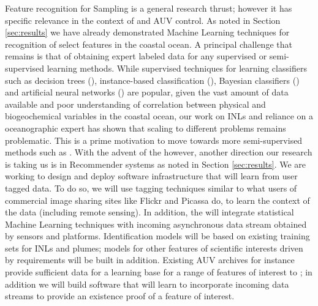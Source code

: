 Feature recognition for Sampling is a general research thrust; however
it has specific relevance in the context of \rx and AUV control. As
noted in Section \ref{sec:results} we have already demonstrated
Machine Learning techniques for recognition of select features in the
coastal ocean. A principal challenge that remains is that of obtaining
expert labeled data for any supervised or semi-supervised learning
methods.  While supervised techniques for learning classifiers such as
decision trees (\cite{Quinlan93-dtrees}), instance-based
classification (\cite{Aha-ibl-ml91}), Bayesian classifiers
(\cite{Jensen2001-BNetworks}) and artificial neural networks
(\cite{ANNsurvey-2000}) are popular, given the vast amount of data
available and poor understanding of correlation between physical and
biogeochemical variables in the coastal ocean, our work on INLs
\cite{mcgann08d,ryan10} and reliance on a oceanographic expert has
shown that scaling to different problems remains problematic. This is
a prime motivation to move towards more semi-supervised methods such
as \cite{kumar11,sergio12}. With the advent of the \od however,
another direction our research is taking us is in Recommender systems
\cite{Adomavicius05} as noted in Section \ref{sec:results}. We are
working to design and deploy software infrastructure that will learn
from user tagged data. To do so, we will use tagging techniques
similar to what users of commercial image sharing sites like Flickr
and Picassa do, to learn the context of the data (including remote
sensing). In addition, the \od will integrate statistical Machine
Learning techniques with incoming asynchronous data stream obtained by
sensors and platforms. Identification models will be based on existing
training sets for INLs and plumes; models for other features of
scientific interests driven by \can requirements will be built in
addition. Existing AUV archives for instance provide sufficient data
for a learning base for a range of features of interest to \can; in
addition we will build software that will learn to incorporate
incoming data streams to provide an existence proof of a feature of
interest. 









